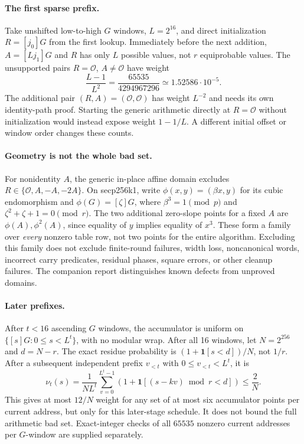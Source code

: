 \documentclass[11pt]{article}
\newcommand{\OO}{\mathcal O}
\begin{document}
\paragraph{The first sparse prefix.}
Take unshifted low-to-high $G$ windows, $L=2^{16}$, and direct initialization $R=[j_0]G$ from the first lookup. Immediately before the next addition, $A=[Lj_1]G$ and $R$ has only $L$ possible values, not $r$ equiprobable values. The unsupported pairs $R=\OO$, $A\ne\OO$ have weight
\begin{equation}
 \frac{L-1}{L^2}=\frac{65535}{4294967296}\simeq1.52586\cdot10^{-5}.
 \label{eq:first-prefix}
\end{equation}
The additional pair $(R,A)=(\OO,\OO)$ has weight $L^{-2}$ and needs its own identity-path proof. Starting the generic arithmetic directly at $R=\OO$ without initialization would instead expose weight $1-1/L$. A different initial offset or window order changes these counts.

\paragraph{Geometry is not the whole bad set.}
For nonidentity $A$, the generic in-place affine domain excludes $R\in\{\OO,A,-A,-2A\}$. On secp256k1, write $\phi(x,y)=(\beta x,y)$ for its cubic endomorphism and $\phi(G)=[\zeta]G$, where $\beta^3=1\pmod p$ and $\zeta^2+\zeta+1=0\pmod r$. The two additional zero-slope points for a fixed $A$ are $\phi(A),\phi^2(A)$, since equality of $y$ implies equality of $x^3$. These form a family over \emph{every} nonzero table row, not two points for the entire algorithm. Excluding this family does not exclude finite-round failures, width loss, noncanonical words, incorrect carry predicates, residual phases, square errors, or other cleanup failures. The companion report distinguishes known defects from unproved domains.

\paragraph{Later prefixes.}
After $t<16$ ascending $G$ windows, the accumulator is uniform on $\{[s]G:0\leq s<L^t\}$, with no modular wrap. After all 16 windows, let $N=2^{256}$ and $d=N-r$. The exact residue probability is $(1+\mathbf1[s<d])/N$, not $1/r$. After a subsequent independent prefix $v_{<t}$ with $0\leq v_{<t}<L^t$, it is
\begin{equation}
 \nu_t(s)=\frac{1}{NL^t}\sum_{v=0}^{L^t-1}
 \left(1+\mathbf1[(s-kv)\bmod r<d]\right)\leq\frac2N.
 \label{eq:post-g}
\end{equation}
This gives at most $12/N$ weight for any set of at most six accumulator points per current address, but only for this later-stage schedule. It does not bound the full arithmetic bad set. Exact-integer checks of all $65535$ nonzero current addresses per $G$-window are supplied separately.
\end{document}

